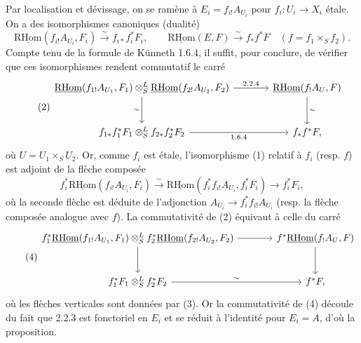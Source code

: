 \documentclass[11pt]{article}
\newcommand{\R}{\mathrm{R}}\newcommand{\RHomCore}{\mathrm{RHom}}
\providecommand{\RHom}{\RHomCore}
\providecommand{\uRHom}{\underline{\RHom}}
\providecommand{\RHom}{\RHomCore}
\providecommand{\RHom}{\R\mathcal{H}om}
\providecommand{\R}{\mathrm R}
\providecommand{\RHom}{\RHomCore}
\begin{document}
Par localisation et dévissage, on se ramène à $E_i=f_{i!}A_{U_i}$ pour $f_i:U_i\to X_i$ étale. On a des isomorphismes canoniques (dualité)
\begin{equation}\tag{1}
\uRHom(f_{i!}A_{U_i},F_i)\xrightarrow{\sim}f_{i*}f_i^{*}F_i,
\qquad
\uRHom(E,F)\xrightarrow{\sim}f_{*}f^{*}F\quad(f=f_1\times_S f_2).
\end{equation}
Compte tenu de la formule de Künneth 1.6.4, il suffit, pour conclure, de vérifier que ces isomorphismes rendent commutatif le carré
\begin{equation}\tag{2}
\begin{tikzcd}[column sep=large,row sep=large]
\uRHom(f_{1!}A_{U_1},F_1)\otimes^{L}_{S}\uRHom(f_{2!}A_{U_2},F_2) \arrow[r,"2.2.4"] \arrow[d,"\sim"'] & \uRHom(f_{!}A_U,F) \arrow[d,"\sim"]\\
f_{1*}f_1^{*}F_1\otimes^{L}_{S}f_{2*}f_2^{*}F_2 \arrow[r,"1.6.4"'] & f_{*}f^{*}F,
\end{tikzcd}
\end{equation}
où $U=U_1\times_S U_2$. Or, comme $f_i$ est étale, l'isomorphisme (1) relatif à $f_i$ (resp. $f$) est adjoint de la flèche composée
\begin{equation}\tag{3}
f_i^{*}\uRHom(f_{i!}A_{U_i},F_i)\xrightarrow{\sim}\uRHom(f_i^{*}f_{i!}A_{U_i},f_i^{*}F_i)\longrightarrow f_i^{*}F_i,
\end{equation}
où la seconde flèche est déduite de l'adjonction $A_{U_i}\to f_i^{*}f_{i!}A_{U_i}$ (resp. la flèche composée analogue avec $f$). La commutativité de (2) équivaut à celle du carré
\begin{equation}\tag{4}
\begin{tikzcd}[column sep=large,row sep=large]
f_1^{*}\uRHom(f_{1!}A_{U_1},F_1)\otimes^{L}_{S}f_2^{*}\uRHom(f_{2!}A_{U_2},F_2) \arrow[r] \arrow[d] & f^{*}\uRHom(f_{!}A_U,F) \arrow[d]\\
f_1^{*}F_1\otimes^{L}_{S}f_2^{*}F_2 \arrow[r,"\sim"] & f^{*}F,
\end{tikzcd}
\end{equation}
où les flèches verticales sont données par (3). Or la commutativité de (4) découle du fait que 2.2.3 est fonctoriel en $E_i$ et se réduit à l'identité pour $E_i=A$, d'où la proposition.
\end{document}
